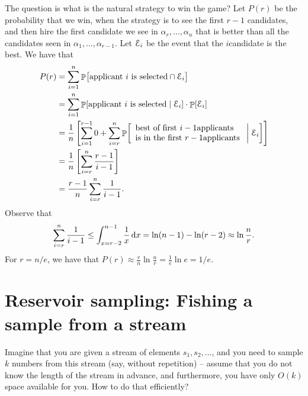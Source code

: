 The question is what is the natural strategy to win the game?  Let
$P(r)$ be the probability that we win, when the strategy is to see the
first $r-1$ candidates, and then hire the first candidate we see in
$\alpha_r, \ldots, \alpha_n$ that is better than all the candidates
seen in $\alpha_1, \ldots, \alpha_{r-1}$.
Let $\EuScript{E}_i$ be the event that the $i$\th candidate is the best.
We have that
\begin{align*}
    P(r)
    &=%
    \sum_{i=1}^{n} \Prob{\bigl. \text{applicant $i$  is selected}
       \cap
       \Event_i}
    \\&%
    =%
    \sum_{i=1}^{n}\ProbCond{\text{applicant  $i$  is
          selected}}{\Event_i}
    \cdot \Prob{\Event_i}
    \\&%
    =%
    \frac{1}{n}
    \left[\sum
      _{i=1}^{r-1}0+\sum
      _{i=r}^{n}\ProbCond{
         \begin{array}{l}
           \text{best of first }
           i-1
           \text{applicants}\\
           \text{is in the first }
           r-1
           \text{applicants}
         \end{array}
      }{\Event_i}
      \right]
      \\
      &=
      \frac {1}{n}
      \left[
        \sum _{i=r}^{n}{\frac
           {r-1}{i-1}}
      \right]\
      \\
      &=
      {\frac {r-1}{n}}\sum _{i=r}^{n}{\frac{1}{i-1}}.
\end{align*}
Observe that 
\begin{equation*}
    \sum _{i=r}^{n}\frac{1}{i-1}
    \leq%
    \int_{x=r-2}^{n-1} \frac{1}{x} \diffX{x}
    =%
    \ln (n-1) - \ln (r-2)
    \approx
    \ln \frac{n}{r}.
\end{equation*}
For $r= n/e$, we have that
$P(r) \approx \frac{r}{n} \ln \frac{n}{r} = \frac{1}{e} \ln e =1/e$.


     




\section{Reservoir sampling: Fishing a sample from a stream}

Imagine that you are given a stream of elements $s_1, s_2, \ldots$,
and you need to sample $k$ numbers from this stream (say, without
repetition) -- assume that you do not know the length of the stream in
advance, and furthermore, you have only $O(k)$ space available for
you. How to do that efficiently?



